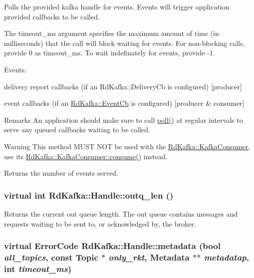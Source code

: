Polls the provided kafka handle for events. Events will trigger application provided callbacks to be called.

The {\ttfamily timeout\_\-ms} argument specifies the maximum amount of time (in milliseconds) that the call will block waiting for events. For non-\/blocking calls, provide 0 as {\ttfamily timeout\_\-ms}. To wait indefinately for events, provide -\/1.

Events:
\begin{DoxyItemize}
\item delivery report callbacks (if an RdKafka::DeliveryCb is configured) \mbox{[}producer\mbox{]}
\item event callbacks (if an \hyperlink{classRdKafka_1_1EventCb}{RdKafka::EventCb} is configured) \mbox{[}producer \& consumer\mbox{]}
\end{DoxyItemize}

\begin{DoxyRemark}{Remarks}
An application should make sure to call \hyperlink{classRdKafka_1_1Handle_a98d3b4ee48457ff13e4d5155e3fc5ea4}{poll()} at regular intervals to serve any queued callbacks waiting to be called.
\end{DoxyRemark}
\begin{DoxyWarning}{Warning}
This method MUST NOT be used with the \hyperlink{classRdKafka_1_1KafkaConsumer}{RdKafka::KafkaConsumer}, use its \hyperlink{classRdKafka_1_1KafkaConsumer_a7dc106f1c3b99767a0930a9cf8cabf84}{RdKafka::KafkaConsumer::consume()} instead.
\end{DoxyWarning}
\begin{DoxyReturn}{Returns}
the number of events served. 
\end{DoxyReturn}
\hypertarget{classRdKafka_1_1Handle_a5ea17c83faa627056fca792be4ec6616}{
\subsubsection[{outq\_\-len}]{\setlength{\rightskip}{0pt plus 5cm}virtual int RdKafka::Handle::outq\_\-len ()}}
\label{classRdKafka_1_1Handle_a5ea17c83faa627056fca792be4ec6616}


Returns the current out queue length. The out queue contains messages and requests waiting to be sent to, or acknowledged by, the broker. \hypertarget{classRdKafka_1_1Handle_ac0cc63c574ce027a184640645151a75c}{
\subsubsection[{metadata}]{\setlength{\rightskip}{0pt plus 5cm}virtual ErrorCode RdKafka::Handle::metadata (bool {\em all\_\-topics}, \/  const {\bf Topic} $\ast$ {\em only\_\-rkt}, \/  {\bf Metadata} $\ast$$\ast$ {\em metadatap}, \/  int {\em timeout\_\-ms})}}
\label{classRdKafka_1_1Handle_ac0cc63c574ce027a184640645151a75c}


